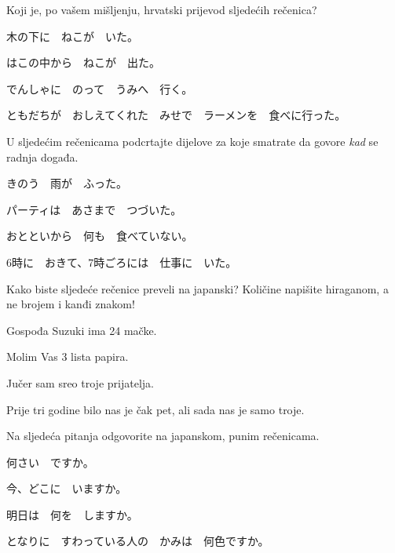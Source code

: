 
\author{Tomislav Mamić}

	
	\begin{mondai}{Koji je, po vašem mišljenju, hrvatski prijevod sljedećih rečenica?}
		\item 木の下に　ねこが　いた。
		\item はこの中から　ねこが　出た。
		\item でんしゃに　のって　うみへ　行く。
		\item ともだちが　おしえてくれた　みせで　ラーメンを　食べに行った。
	\end{mondai}

	\begin{mondai}{U sljedećim rečenicama podcrtajte dijelove za koje smatrate da govore \textit{kad} se radnja događa.}
		\item きのう　雨が　ふった。
		\item パーティは　あさまで　つづいた。
		\item おとといから　何も　食べていない。
		\item 6時に　おきて、7時ごろには　仕事に　いた。
	\end{mondai}

	\begin{mondai}{Kako biste sljedeće rečenice preveli na japanski? Količine napišite hiraganom, a ne brojem i kanđi znakom!}
		\item Gospođa Suzuki ima 24 mačke.
		\item Molim Vas 3 lista papira.
		\item Jučer sam sreo troje prijatelja.
		\item Prije tri godine bilo nas je čak pet, ali sada nas je samo troje.
	\end{mondai}

	\begin{mondai}{Na sljedeća pitanja odgovorite na japanskom, punim rečenicama.}
		\item 何さい　ですか。
		\item 今、どこに　いますか。
		\item 明日は　何を　しますか。
		\item となりに　すわっている人の　かみは　何色ですか。
	\end{mondai}


